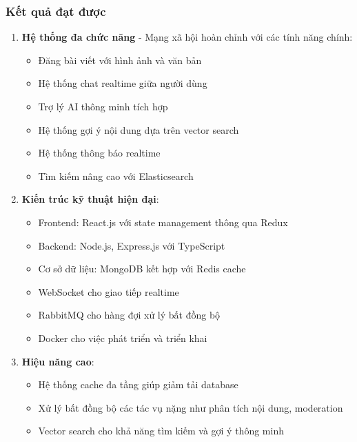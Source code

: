 \subsubsection{Kết quả đạt được}
\begin{enumerate}
    \item \textbf{Hệ thống đa chức năng} - Mạng xã hội hoàn chỉnh với các tính năng chính:
    \begin{itemize}
        \item Đăng bài viết với hình ảnh và văn bản
        \item Hệ thống chat realtime giữa người dùng
        \item Trợ lý AI thông minh tích hợp
        \item Hệ thống gợi ý nội dung dựa trên vector search
        \item Hệ thống thông báo realtime
        \item Tìm kiếm nâng cao với Elasticsearch
    \end{itemize}
    
    \item \textbf{Kiến trúc kỹ thuật hiện đại}:
    \begin{itemize}
        \item Frontend: React.js với state management thông qua Redux
        \item Backend: Node.js, Express.js với TypeScript
        \item Cơ sở dữ liệu: MongoDB kết hợp với Redis cache
        \item WebSocket cho giao tiếp realtime
        \item RabbitMQ cho hàng đợi xử lý bất đồng bộ
        \item Docker cho việc phát triển và triển khai
    \end{itemize}
    
    \item \textbf{Hiệu năng cao}:
    \begin{itemize}
        \item Hệ thống cache đa tầng giúp giảm tải database
        \item Xử lý bất đồng bộ các tác vụ nặng như phân tích nội dung, moderation
        \item Vector search cho khả năng tìm kiếm và gợi ý thông minh
    \end{itemize}
\end{enumerate}


